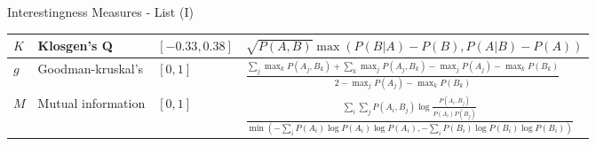 \begin{frame}{Interestingness Measures - List (I)}
{\begin{tabular}{|m{}<{\centering}|m{}<{\centering}|m{}<{\centering}|m{}<{\centering}|}
			\hline
			$K$             & Klosgen's Q        & $[-0.33,0.38]$ & $\sqrt{P(A,B)}\max(P(B|A)-P(B),P(A|B)-P(A))$                                                                                                              \\
			\hline
			$g$             & Goodman-kruskal's  & $[0,1]$        & $\frac{\sum_j \max_k P(A_j,B_k) + \sum_k \max_j P(A_j,B_k)-\max_j P(A_j) -
			\max_k P(B_k)}{2 - \max_j P(A_j) - \max_k P(B_k)}$                                                                                                                                                                \\
			\hline
			$M$             & Mutual information & $[0,1]$        & $\frac{\sum_i \sum_j P(A_i,B_j) \log \frac{P(A_i,B_j)}{P(A_i)P(B_j)}}{\min(-\sum_i P(A_i) \log P(A_i)\log P(A_i),-\sum_i P(B_i)\log P(B_i) \log P(B_i))}$ \\
			\hline
		\end{tabular}
	}
\end{frame}

